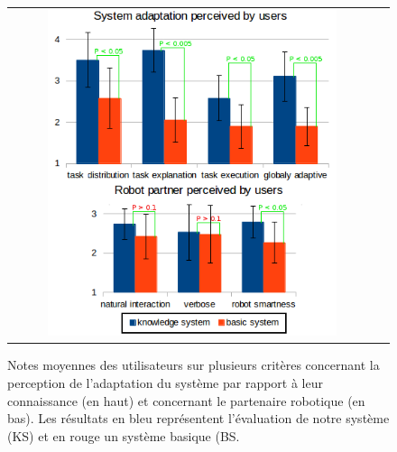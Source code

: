 \documentclass[a4paper,11pt,twoside]{StyleThese}
\begin{document}
 \begin{figure}[ht!]

 \centering
 \begin{tabular}{cc}
  \includegraphics[width=0.81\textwidth]{img/respvalue3.png}
 \end{tabular}
 \caption{Notes moyennes des utilisateurs sur plusieurs critères concernant la perception de l'adaptation du système par rapport à leur connaissance  (en haut) et concernant le partenaire robotique (en bas). Les résultats en bleu représentent l'évaluation de notre système (KS) et en rouge un système basique (BS.}
 \label{fig:results}
 \end{figure}
\end{document}
